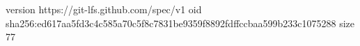 version https://git-lfs.github.com/spec/v1
oid sha256:ed617aa5fd3c4c585a70c5f8c7831be9359f8892fdffccbaa599b233c1075288
size 77
